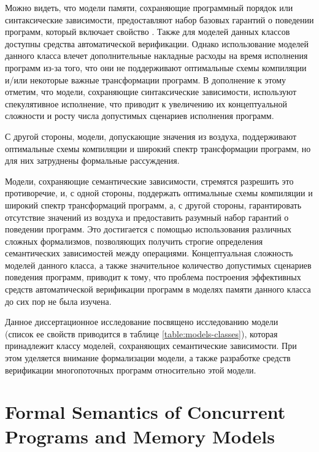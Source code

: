 

Можно видеть, что модели памяти,
сохраняющие программный порядок или синтаксические зависимости, 
предоставляют набор базовых гарантий о поведении программ, 
который включает свойство \DRF. Также для моделей данных классов 
доступны средства автоматической верификации.
Однако использование моделей данного класса влечет 
дополнительные накладные расходы на время исполнения программ 
из-за того, что они не поддерживают оптимальные схемы компиляции
и/или некоторые важные трансформации программ.
В дополнение к этому отметим, что модели,
сохраняющие синтаксические зависимости, используют спекулятивное исполнение, 
что приводит к увеличению их концептуальной сложности  
и росту числа допустимых сценариев исполнения программ. 

С другой стороны, модели, допускающие значения из воздуха, 
поддерживают оптимальные схемы компиляции и широкий спектр 
трансформации программ, но для них затруднены 
формальные рассуждения. 

Модели, сохраняющие семантические зависимости, стремятся 
разрешить это противоречие, и, с одной стороны, 
поддержать оптимальные схемы компиляции и широкий спектр 
трансформаций программ, а, с другой стороны, 
гарантировать отсутствие значений из воздуха 
и предоставить разумный набор гарантий о поведении программ.
Это достигается  с помощью использования различных 
сложных формализмов, позволяющих получить строгие определения
семантических зависимостей между операциями.
Концептуальная сложность моделей данного класса, 
а также значительное количество допустимых сценариев поведения программ,
приводит к тому, что проблема построения эффективных 
средств автоматической верификации программ в 
моделях памяти данного класса до сих пор не была изучена. 

Данное диссертационное исследование посвящено исследованию модели \Wkm~\cite{Chakraborty-Vafeiadis:POPL19}
(список ее свойств  приводится в таблице \ref{table:models-classes}), 
которая принадлежит классу моделей, сохраняющих семантические зависимости. При этом уделяется внимание 
формализации модели, а также разработке средств верификации
многопоточных программ относительно этой модели. 

\section{Formal Semantics of Concurrent Programs and Memory Models}

